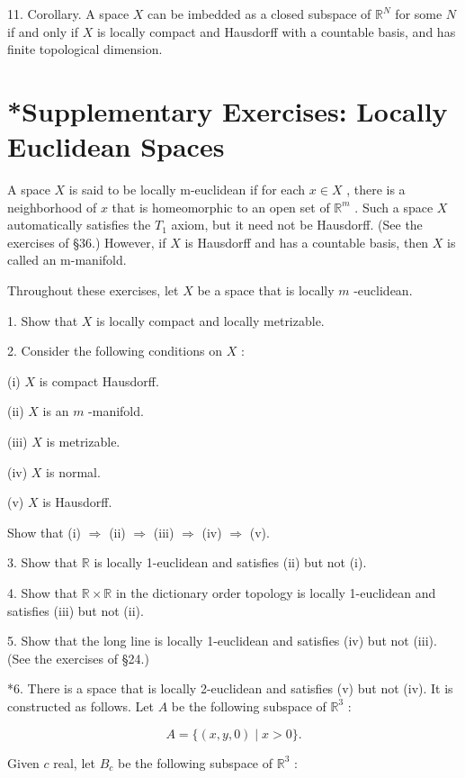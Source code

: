 \documentclass[10pt]{article}
\begin{document}
11. Corollary. A space \(X\) can be imbedded as a closed subspace of \({\mathbb{R}}^{N}\) for some \(N\) if and only if \(X\) is locally compact and Hausdorff with a countable basis, and has finite topological dimension.

\section*{*Supplementary Exercises: Locally Euclidean Spaces}

A space \(X\) is said to be locally m-euclidean if for each \(x \in  X\) , there is a neighborhood of \(x\) that is homeomorphic to an open set of \({\mathbb{R}}^{m}\) . Such a space \(X\) automatically satisfies the \({T}_{1}\) axiom, but it need not be Hausdorff. (See the exercises of §36.) However, if \(X\) is Hausdorff and has a countable basis, then \(X\) is called an m-manifold.

Throughout these exercises, let \(X\) be a space that is locally \(m\) -euclidean.

1. Show that \(X\) is locally compact and locally metrizable.

2. Consider the following conditions on \(X\) :

(i) \(X\) is compact Hausdorff.

(ii) \(X\) is an \(m\) -manifold.

(iii) \(X\) is metrizable.

(iv) \(X\) is normal.

(v) \(X\) is Hausdorff.

Show that (i) \(\Rightarrow\) (ii) \(\Rightarrow\) (iii) \(\Rightarrow\) (iv) \(\Rightarrow\) (v).

3. Show that \(\mathbb{R}\) is locally 1-euclidean and satisfies (ii) but not (i).

4. Show that \(\mathbb{R} \times  \mathbb{R}\) in the dictionary order topology is locally 1-euclidean and satisfies (iii) but not (ii).

5. Show that the long line is locally 1-euclidean and satisfies (iv) but not (iii). (See the exercises of §24.)

*6. There is a space that is locally 2-euclidean and satisfies (v) but not (iv). It is constructed as follows. Let \(A\) be the following subspace of \({\mathbb{R}}^{3}\) :

\[
A = \{ \left( {x,y,0}\right)  \mid  x > 0\} .
\]

Given \(c\) real, let \({B}_{c}\) be the following subspace of \({\mathbb{R}}^{3}\) :
\end{document}
